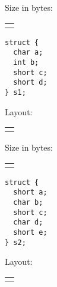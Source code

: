 \documentclass[letterpaper]{article}
\makeatletter
\newif\ifkey
\newcommand{\field}[2][]{
  \begin{tabular}{@{}c@{}}
    \fbox{\TextField[borderwidth=0,charsize=12pt,multiline=true,name={#2},#1]{}}
  \end{tabular}
  }
\makeatother
\begin{document}
\begin{Form}
\begin{enumerate}
\begin{minipage}{0.6\textwidth}
    \medskip
    
    Size in bytes: \field[height=2pc,width=4pc,multiline=false,maxlen=4]{2a1}
    
  \end{minipage}

  \vspace{1pc}


\ifkey%
\begin{minipage}{0.3\columnwidth}
12 bytes:

\begin{verbatim}
...a
bbbb
..cc
\end{verbatim}

or

\begin{verbatim}
dddd
..ee
\end{verbatim}
\end{minipage}
\fi


  \begin{minipage}{0.3\textwidth}
\begin{lstlisting}
struct {
  char a;
  int b;
  short c;
  short d;
} s1;
\end{lstlisting}
  \end{minipage}%
  \begin{minipage}{0.6\textwidth}
    Layout: \field[height=6pc,width=20pc]{2b}

    \medskip
    
    Size in bytes: \field[height=2pc,width=4pc,multiline=false,maxlen=4]{2b1}
    
  \end{minipage}

\ifkey
12 bytes: \quad \begin{minipage}{0.6in}
\begin{verbatim}
...a
bbbb
ddcc
\end{verbatim}
\end{minipage}
\fi

\vspace{1pc}

\begin{minipage}{0.3\textwidth}
\begin{lstlisting}
struct {
  short a;
  char b;
  short c;
  char d;
  short e;
} s2;
\end{lstlisting}
  \end{minipage}%
  \begin{minipage}{0.6\textwidth}
    Layout: \field[height=6pc,width=20pc]{2c}


\end{minipage}
\end{enumerate}
\end{Form}
\end{document}
